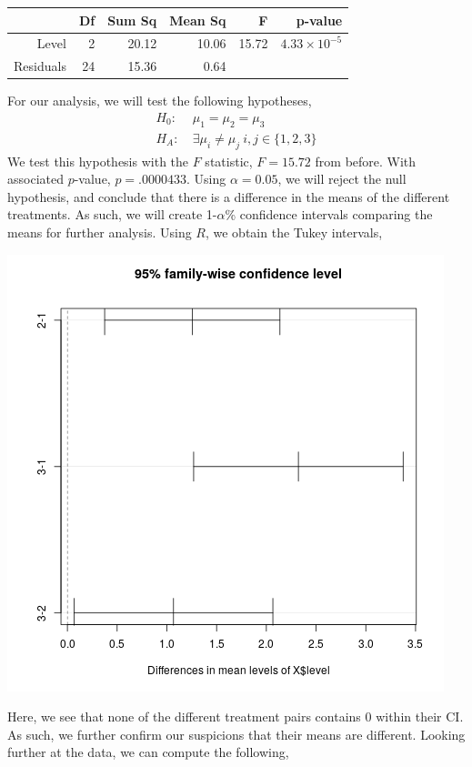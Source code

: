\documentclass[letterpaper,10pt]{article}
\begin{document}
\begin{enumerate}
\begin{center}
\begin{tabular}{|r|rrrrr|}
\hline
& Df & Sum Sq & Mean Sq & F & p-value\\\hline
Level & 2 & 20.12 & 10.06 & 15.72 & $4.33\times 10^{-5}$\\
Residuals & 24 & 15.36 & 0.64 &&\\\hline
\end{tabular}
\end{center}
For our analysis, we will test the following hypotheses,
\begin{align*}
H_0:\ & \mu_1=\mu_2=\mu_3\\
H_A:\ & \exists \mu_i\neq \mu_j\ i,j\in \{1,2,3\}
\end{align*}
We test this hypothesis with the $F$ statistic, $F=15.72$ from before. With associated $p$-value, $p=.0000433$. Using $\alpha=0.05$, we will reject the null hypothesis, and conclude that there is a difference in the means of the different treatments. As such, we will create 1-$\alpha$\% confidence intervals comparing the means for further analysis. Using $R$, we obtain the Tukey intervals,
\begin{center}
\includegraphics[scale=.75]{prodtukey.png}
\end{center}
Here, we see that none of the different treatment pairs contains $0$ within their CI. As such, we further confirm our suspicions that their means are different. Looking further at the data, we can compute the following,

\end{enumerate}
\end{document}
